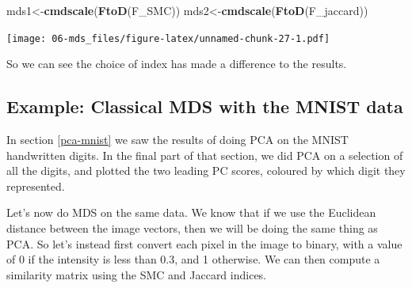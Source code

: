 \documentclass[
]{book}
\newenvironment{Shaded}{\begin{snugshade}}{\end{snugshade}}
\newcommand{\FunctionTok}[1]{\textcolor[rgb]{0.13,0.29,0.53}{\textbf{#1}}}
\newcommand{\NormalTok}[1]{#1}
\newcommand{\OtherTok}[1]{\textcolor[rgb]{0.56,0.35,0.01}{#1}}
\theoremstyle{definition}
\theoremstyle{definition}
\theoremstyle{definition}
\theoremstyle{definition}
\theoremstyle{remark}
\begin{document}
\begin{Shaded}
\begin{Highlighting}[]
\NormalTok{mds1}\OtherTok{\textless{}{-}}\FunctionTok{cmdscale}\NormalTok{(}\FunctionTok{FtoD}\NormalTok{(F\_SMC))}
\NormalTok{mds2}\OtherTok{\textless{}{-}}\FunctionTok{cmdscale}\NormalTok{(}\FunctionTok{FtoD}\NormalTok{(F\_jaccard))}
\end{Highlighting}
\end{Shaded}

\texttt{[image: 06-mds\_files/figure-latex/unnamed-chunk-27-1.pdf]}

So we can see the choice of index has made a difference to the results.

\subsection{Example: Classical MDS with the MNIST data}\label{example-classical-mds-with-the-mnist-data}

In section \ref{pca-mnist} we saw the results of doing PCA on the MNIST handwritten digits. In the final part of that section, we did PCA on a selection of all the digits, and plotted the two leading PC scores, coloured by which digit they represented.

Let's now do MDS on the same data. We know that if we use the Euclidean distance between the image vectors, then we will be doing the same thing as PCA. So let's instead first convert each pixel in the image to binary, with a value of 0 if the intensity is less than 0.3, and 1 otherwise. We can then compute a similarity matrix using the SMC and Jaccard indices.
\end{document}
